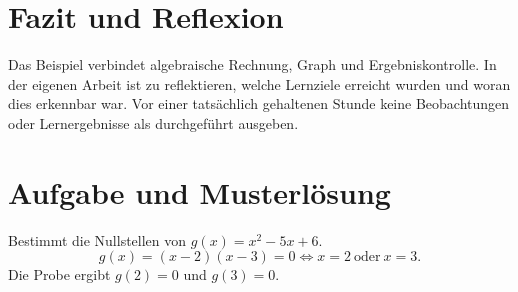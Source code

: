 \documentclass[12pt,a4paper,ngerman]{scrartcl}
\theoremstyle{definition}
\newcommand{\personA}{Vorname Nachname 1}
\newcommand{\personB}{Vorname Nachname 2}
\begin{document}
\section{Fazit und Reflexion}
Das Beispiel verbindet algebraische Rechnung, Graph und Ergebniskontrolle.
In der eigenen Arbeit ist zu reflektieren, welche Lernziele erreicht wurden
und woran dies erkennbar war. Vor einer tatsächlich gehaltenen Stunde keine
Beobachtungen oder Lernergebnisse als durchgeführt ausgeben.

\clearpage
{}



\clearpage
\appendix
\section{Aufgabe und Musterlösung}
\label{sec:anhang}
Bestimmt die Nullstellen von \(g(x)=x^2-5x+6\).
\[
  g(x)=(x-2)(x-3)=0 \iff x=2\ \text{oder}\ x=3.
\]
Die Probe ergibt \(g(2)=0\) und \(g(3)=0\).

\end{document}
